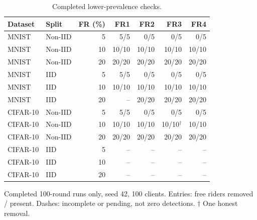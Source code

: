 \begin{table}[t]\centering\footnotesize\setlength{\tabcolsep}{3pt}
\caption{Completed lower-prevalence checks.}\label{tab:low-share}
\begin{tabular}{llrrrrr}\toprule
Dataset & Split & FR (\%) & FR1 & FR2 & FR3 & FR4 \\ \midrule
MNIST & Non-IID & 5 & 5/5 & 0/5 & 0/5 & 0/5 \\
MNIST & Non-IID & 10 & 10/10 & 10/10 & 10/10 & 10/10 \\
MNIST & Non-IID & 20 & 20/20 & 20/20 & 20/20 & 20/20 \\
\midrule
MNIST & IID & 5 & 5/5 & 0/5 & 0/5 & 0/5 \\
MNIST & IID & 10 & 10/10 & 10/10 & 10/10 & 10/10 \\
MNIST & IID & 20 & -- & 20/20 & 20/20 & 20/20 \\
\midrule
CIFAR-10 & Non-IID & 5 & 5/5 & 0/5 & 0/5 & 0/5 \\
CIFAR-10 & Non-IID & 10 & 10/10 & 10/10 & 10/10$^{\dagger}$ & 10/10 \\
CIFAR-10 & Non-IID & 20 & 20/20 & 20/20 & 20/20 & 20/20 \\
\midrule
CIFAR-10 & IID & 5 & -- & -- & -- & -- \\
CIFAR-10 & IID & 10 & -- & -- & -- & -- \\
CIFAR-10 & IID & 20 & -- & -- & -- & -- \\
\bottomrule
\end{tabular}
\par\smallskip\parbox{\columnwidth}{\scriptsize Completed 100-round runs only, seed 42, 100 clients. Entries: free riders removed / present. Dashes: incomplete or pending, not zero detections. $\dagger$ One honest removal.}
\end{table}
